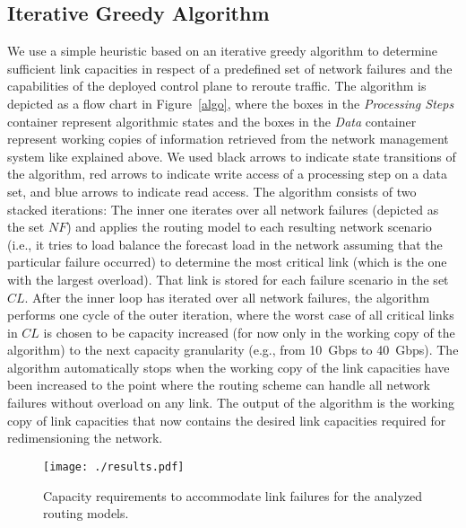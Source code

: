 \documentclass[10pt, conference]{IEEEtran}
\begin{document}
\subsection{Iterative Greedy Algorithm}\label{algo_subsec}
We use a simple heuristic based on an iterative greedy algorithm to determine sufficient link capacities in respect of a predefined set of network failures and the capabilities of the deployed control plane to reroute traffic. The algorithm is depicted as a flow chart in Figure~\ref{algo}, where the boxes in the \emph{Processing Steps} container represent algorithmic states and the boxes in the \emph{Data} container represent working copies of information retrieved from the network management system like explained above. We used black arrows to indicate state transitions of the algorithm, red arrows to indicate write access of a processing step on a data set, and blue arrows to indicate read access. The algorithm consists of two stacked iterations: The inner one iterates over all network failures (depicted as the set $NF$) and applies the routing model to each resulting network scenario (i.e., it tries to load balance the forecast load in the network assuming that the particular failure occurred) to determine the most critical link (which is the one with the largest overload). That link is stored for each failure scenario in the set $CL$. After the inner loop has iterated over all network failures, the algorithm performs one cycle of the outer iteration, where the worst case of all critical links in $CL$ is chosen to be capacity increased (for now only in the working copy of the algorithm) to the next capacity granularity (e.g., from 10~Gbps to 40~Gbps). The algorithm automatically stops when the working copy of the link capacities have been increased to the point where the routing scheme can handle all network failures without overload on any link. The output of the algorithm is the working copy of link capacities that now contains the desired link capacities required for redimensioning the network.











\begin{figure}[t] \center
\texttt{[image: ./results.pdf]}
\caption{Capacity requirements to accommodate link failures for the analyzed routing models.}
\label{result1} \end{figure}
\end{document}

